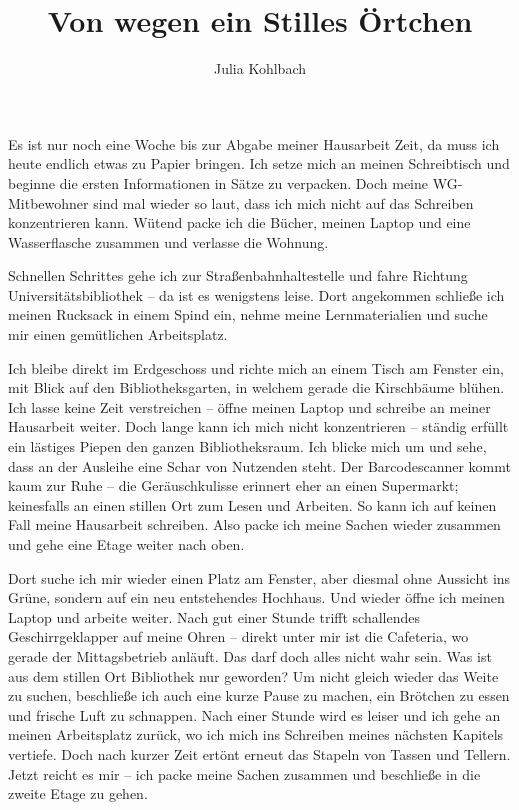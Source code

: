 \documentclass[a4paper,
fontsize=11pt,
oneside,
numbers=noperiodatend,
parskip=half-,
bibliography=totoc,
final
]{scrartcl}
\title{\LARGE{Von wegen ein Stilles Örtchen}}%
\author{Julia Kohlbach} %
\date{}
\begin{document}
\maketitle
\thispagestyle{fancyplain} 


Es ist nur noch eine Woche bis zur Abgabe meiner Hausarbeit Zeit, da
muss ich heute endlich etwas zu Papier bringen. Ich setze mich an meinen
Schreibtisch und beginne die ersten Informationen in Sätze zu verpacken.
Doch meine WG-Mitbewohner sind mal wieder so laut, dass ich mich nicht
auf das Schreiben konzentrieren kann. Wütend packe ich die Bücher,
meinen Laptop und eine Wasserflasche zusammen und verlasse die Wohnung.

Schnellen Schrittes gehe ich zur Straßenbahnhaltestelle und fahre
Richtung Universitätsbibliothek -- da ist es wenigstens leise. Dort
angekommen schließe ich meinen Rucksack in einem Spind ein, nehme meine
Lernmaterialien und suche mir einen gemütlichen Arbeitsplatz.

Ich bleibe direkt im Erdgeschoss und richte mich an einem Tisch am
Fenster ein, mit Blick auf den Bibliotheksgarten, in welchem gerade die
Kirschbäume blühen. Ich lasse keine Zeit verstreichen -- öffne meinen
Laptop und schreibe an meiner Hausarbeit weiter. Doch lange kann ich
mich nicht konzentrieren -- ständig erfüllt ein lästiges Piepen den
ganzen Bibliotheksraum. Ich blicke mich um und sehe, dass an der
Ausleihe eine Schar von Nutzenden steht. Der Barcodescanner kommt kaum
zur Ruhe -- die Geräuschkulisse erinnert eher an einen Supermarkt;
keinesfalls an einen stillen Ort zum Lesen und Arbeiten. So kann ich auf
keinen Fall meine Hausarbeit schreiben. Also packe ich meine Sachen
wieder zusammen und gehe eine Etage weiter nach oben.

Dort suche ich mir wieder einen Platz am Fenster, aber diesmal ohne
Aussicht ins Grüne, sondern auf ein neu entstehendes Hochhaus. Und
wieder öffne ich meinen Laptop und arbeite weiter. Nach gut einer Stunde
trifft schallendes Geschirrgeklapper auf meine Ohren -- direkt unter mir
ist die Cafeteria, wo gerade der Mittagsbetrieb anläuft. Das darf doch
alles nicht wahr sein. Was ist aus dem stillen Ort Bibliothek nur
geworden? Um nicht gleich wieder das Weite zu suchen, beschließe ich
auch eine kurze Pause zu machen, ein Brötchen zu essen und frische Luft
zu schnappen. Nach einer Stunde wird es leiser und ich gehe an meinen
Arbeitsplatz zurück, wo ich mich ins Schreiben meines nächsten Kapitels
vertiefe. Doch nach kurzer Zeit ertönt erneut das Stapeln von Tassen und
Tellern. Jetzt reicht es mir -- ich packe meine Sachen zusammen und
beschließe in die zweite Etage zu gehen.
\end{document}
